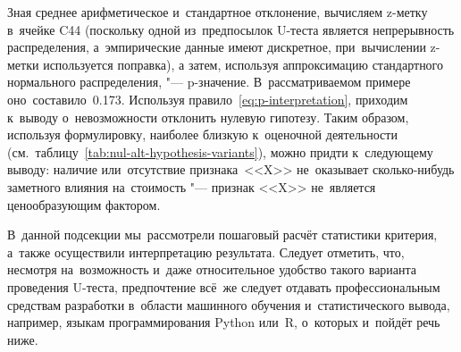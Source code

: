 \documentclass[]{scrreprt}
\begin{document}
Зная среднее арифметическое и~стандартное отклонение, вычисляем z-метку в~ячейке C44 (поскольку одной из~предпосылок U-теста является непрерывность распределения, а~эмпирические данные имеют дискретное, при~вычислении z-метки используется поправка), а затем, используя аппроксимацию стандартного нормального распределения, "--- p-значение. В~рассматриваемом примере оно~составило~0.173. Используя правило~\ref{eq:p-interpretation}, приходим к~выводу о~невозможности отклонить нулевую гипотезу. Таким образом, используя формулировку, наиболее близкую к~оценочной деятельности (см.~таблицу~\ref{tab:nul-alt-hypothesis-variants}), можно придти к~следующему выводу: наличие или~отсутствие признака~<<X>> не~оказывает сколько-нибудь заметного влияния на~стоимость "--- признак <<X>> не~является ценообразующим фактором.

В~данной подсекции мы~рассмотрели пошаговый расчёт статистики критерия, а~также осуществили интерпретацию результата. Следует отметить, что, несмотря на~возможность и~даже относительное удобство такого варианта проведения U-теста, предпочтение всё~же следует отдавать профессиональным средствам разработки в~области машинного обучения и~статистического вывода, например, языкам программирования Python или~R, о~которых и~пойдёт речь ниже.
%

\clearpage
\end{document}
